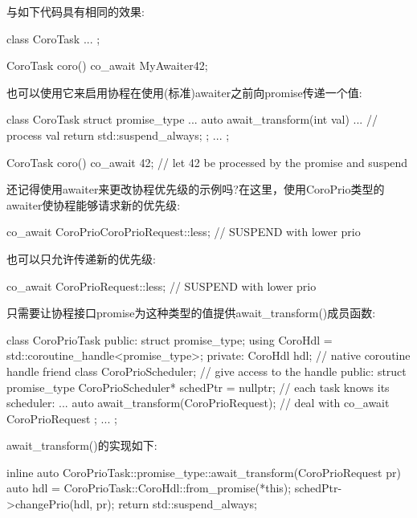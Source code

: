 与如下代码具有相同的效果:

\begin{cpp}
class CoroTask {
	...
};

CoroTask coro()
{
	co_await MyAwaiter{42};
}
\end{cpp}

也可以使用它来启用协程在使用(标准)awaiter之前向promise传递一个值:

\begin{cpp}
class CoroTask {
	struct promise_type {
		...
		auto await_transform(int val) {
			... // process val
			return std::suspend_always{};
		}
	};
	...
};

CoroTask coro()
{
	co_await 42; // let 42 be processed by the promise and suspend
}
\end{cpp}


还记得使用awaiter来更改协程优先级的示例吗?在这里，使用CoroPrio类型的awaiter使协程能够请求新的优先级:

\begin{cpp}
co_await CoroPrio{CoroPrioRequest::less}; // SUSPEND with lower prio
\end{cpp}

也可以只允许传递新的优先级:

\begin{cpp}
co_await CoroPrioRequest::less; // SUSPEND with lower prio
\end{cpp}

只需要让协程接口promise为这种类型的值提供await\_transform()成员函数:

\begin{cpp}
class CoroPrioTask {
public:
	struct promise_type;
	using CoroHdl = std::coroutine_handle<promise_type>;
private:
	CoroHdl hdl; // native coroutine handle
	friend class CoroPrioScheduler; // give access to the handle
public:
	struct promise_type {
		CoroPrioScheduler* schedPtr = nullptr; // each task knows its scheduler:
		...
		auto await_transform(CoroPrioRequest); // deal with co_await CoroPrioRequest
	};
	...
};
\end{cpp}

await\_transform()的实现如下:

\begin{cpp}
inline auto CoroPrioTask::promise_type::await_transform(CoroPrioRequest pr) {
	auto hdl = CoroPrioTask::CoroHdl::from_promise(*this);
	schedPtr->changePrio(hdl, pr);
	return std::suspend_always{};
}
\end{cpp}

